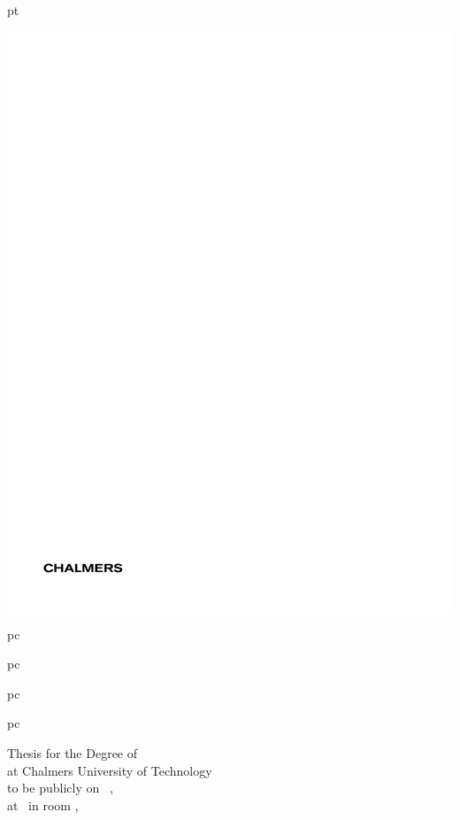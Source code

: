 \documentclass[12pt,a4paper,pdftex]{article}
\begin{document}
\pagestyle{empty}

 pt

{\centering

  \includegraphics[scale=1.25]{frontmatter/standard-images/Logotyp38mm}

   pc 

  {\LARGE\thesistitle\par}

   pc

  {\large\thesissubtitle\par}

   pc

  {\Large\scshape\thesisauthor\par}

   pc

  Thesis for the Degree of
  \\%
  at Chalmers University of Technology\\
  to be publicly  
  on \ , \\
  at \ in room ,\ 

}
\end{document}
